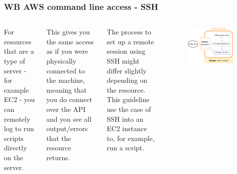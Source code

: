 \documentclass[aspectratio=169]{beamer} %
\begin{document}
\begin{frame}
	\frametitle{WB AWS command line access - SSH}
	\begin{columns}[c]
		For resources that are a type of server - for example EC2 -
		you can remotely log to run scripts directly on the server. 
		
		\vspace{.5cm}
		
		This gives you the same access as if 
		you were physically connected to the machine, 
		meaning that you do connect over the API and 
		you see all output/errors that the resource returns.
		
		\vspace{.5cm}
		
		The process to set up a remote session using SSH
		might differ slightly depending on the resource.
		This guideline use the case of SSH into 
		an EC2 instance to, for example, run a script.

		\begin{figure}
			\centering
			\includegraphics[width=\textwidth]{./img/wb-aws.png}
		\end{figure}

	\end{columns}
\end{frame}
\end{document}
